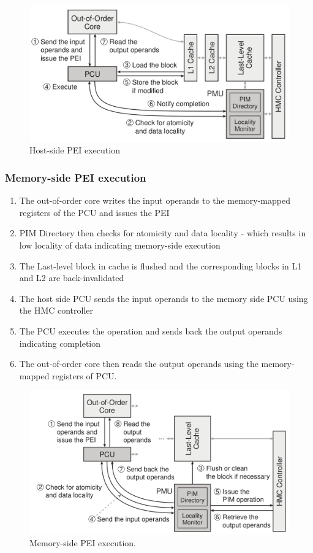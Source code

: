 \documentclass[a4paper,12pt, final]{report}
\begin{document}
\begin{figure}[h]
  \centering
  \includegraphics[width=0.8\linewidth]{host.png}
  \caption{Host-side PEI execution}
\end{figure}

\subsubsection{Memory-side PEI execution}
\begin{enumerate}
  \setlength\itemsep{0em}
  \item The out-of-order core writes the input operands to the memory-mapped
    registers of the PCU and issues the PEI
  \item PIM Directory then checks for atomicity and data locality - which
    results in low locality of data indicating memory-side execution
  \item The Last-level block in cache is flushed and the corresponding blocks
    in L1 and L2 are back-invalidated
  \item The host side PCU sends the input operands to the memory side PCU using
    the HMC controller
  \item The PCU executes the operation and sends back the output operands 
    indicating completion
  \item The out-of-order core then reads the output operands using the
    memory-mapped registers of PCU.
\end{enumerate}

\begin{figure}[h]
  \centering
  \includegraphics[width=0.8\linewidth]{memory.png}
  \caption{Memory-side PEI execution.}
\end{figure}
\end{document}
